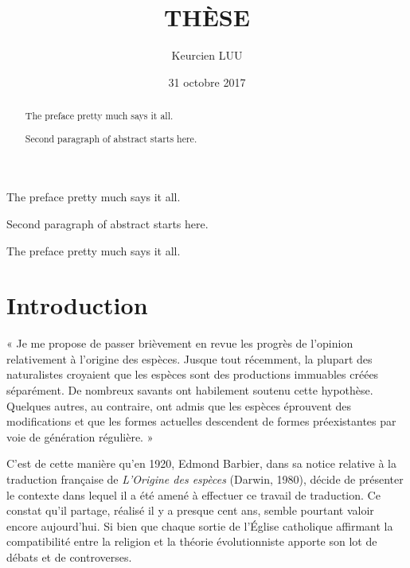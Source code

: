 \documentclass[12pt,twoside]{reedthesis}
\title{THÈSE}
\author{Keurcien LUU}
\date{31 octobre 2017}
\begin{document}
      \maketitle
  
  \frontmatter %
  \pagestyle{empty} %

      \begin{acknowledgements}
      The preface pretty much says it all. \par  Second paragraph of abstract
      starts here.
    \end{acknowledgements}
  
      \begin{preface}
      The preface pretty much says it all. \par
    \end{preface}
  
      \hypersetup{linkcolor=black}
    \setcounter{tocdepth}{2}
    \tableofcontents
  
      \listoftables
  
      \listoffigures
  
      \begin{abstract}
      The preface pretty much says it all. \par  Second paragraph of abstract
      starts here.
    \end{abstract}
  
  
  \mainmatter %
  \pagestyle{fancyplain} %

  \chapter*{Introduction}\label{introduction}
  
  « Je me propose de passer brièvement en revue les progrès de l'opinion
  relativement à l'origine des espèces. Jusque tout récemment, la plupart
  des naturalistes croyaient que les espèces sont des productions
  immuables créées séparément. De nombreux savants ont habilement soutenu
  cette hypothèse. Quelques autres, au contraire, ont admis que les
  espèces éprouvent des modifications et que les formes actuelles
  descendent de formes préexistantes par voie de génération régulière. »
  
  C'est de cette manière qu'en 1920, Edmond Barbier, dans sa notice
  relative à la traduction française de \textit{L'Origine des espèces}
  (Darwin, 1980), décide de présenter le contexte dans lequel il a été
  amené à effectuer ce travail de traduction. Ce constat qu'il partage,
  réalisé il y a presque cent ans, semble pourtant valoir encore
  aujourd'hui. Si bien que chaque sortie de l'Église catholique affirmant
  la compatibilité entre la religion et la théorie évolutionniste apporte
  son lot de débats et de controverses.
  
\end{document}
